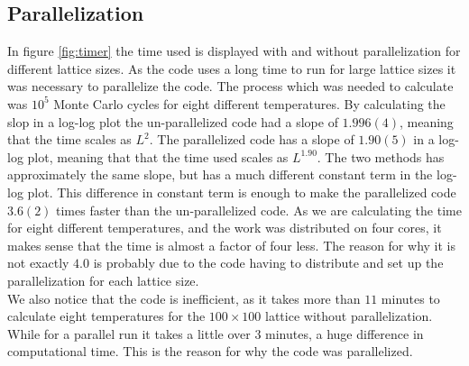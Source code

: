 \documentclass[%
 reprint,
nofootinbib,
aps,
]{revtex4-1}
\begin{document}
\subsection{Parallelization}
In figure \vref{fig:timer} the time used is displayed with and without parallelization for different lattice sizes. As the code uses a long time to run for large lattice sizes it was necessary to parallelize the code. The process which was needed to calculate was $10^5$ Monte Carlo cycles for eight different temperatures. By calculating the slop in a log-log plot the un-parallelized code had a slope of $1.996(4)$, meaning that the time scales as $L^2$. The parallelized code has a slope of $1.90(5)$ in a log-log plot, meaning that that the time used scales as $L^{1.90}$. The two methods has approximately the same slope, but has a much different constant term in the log-log plot. This difference in constant term is enough to make the parallelized code $3.6(2)$ times faster than the un-parallelized code. As we are calculating the time for eight different temperatures, and the work was distributed on four cores, it makes sense that the time is almost a factor of four less. The reason for why it is not exactly $4.0$ is probably due to the code having to distribute and set up the parallelization for each lattice size. \\
We also notice that the code is inefficient, as it takes more than $11$ minutes to calculate eight temperatures for the $100\times 100$ lattice without parallelization. While for a parallel run it takes a little over $3$ minutes, a huge difference in computational time. This is the reason for why the code was parallelized.
\end{document}
